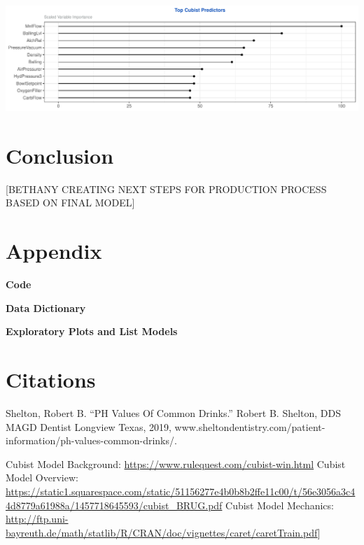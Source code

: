 \documentclass[]{report}
\begin{document}
\includegraphics{Group2_Project2_Fall2019_files/figure-latex/unnamed-chunk-13-1.pdf}

\hypertarget{conclusion}{%
\chapter{Conclusion}\label{conclusion}}

{[}BETHANY CREATING NEXT STEPS FOR PRODUCTION PROCESS BASED ON FINAL
MODEL{]}

\hypertarget{Appendix}{%
\chapter*{Appendix}\label{Appendix}}

\textbf{Code}

\textbf{Data Dictionary}

\textbf{Exploratory Plots and List Models}

\hypertarget{citations}{%
\chapter{Citations}\label{citations}}

Shelton, Robert B. ``PH Values Of Common Drinks.'' Robert B. Shelton,
DDS MAGD Dentist Longview Texas, 2019,
www.sheltondentistry.com/patient-information/ph-values-common-drinks/.

Cubist Model Background: \url{https://www.rulequest.com/cubist-win.html}
Cubist Model Overview:
\url{https://static1.squarespace.com/static/51156277e4b0b8b2ffe11c00/t/56e3056a3c44d8779a61988a/1457718645593/cubist_BRUG.pdf}
Cubist Model Mechanics:
\url{http://ftp.uni-bayreuth.de/math/statlib/R/CRAN/doc/vignettes/caret/caretTrain.pdf}{]}
\end{document}
